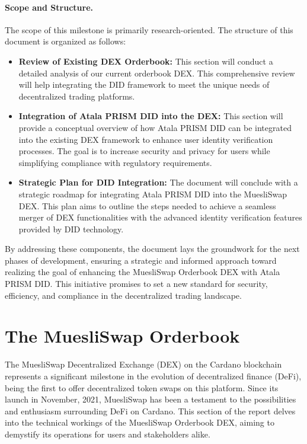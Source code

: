 \documentclass[11pt]{article}
\begin{document}
\paragraph{Scope and Structure.} The scope of this milestone is primarily research-oriented. The structure of this document is organized as follows:
\begin{itemize}
\item \textbf{Review of Existing DEX Orderbook:} This section will conduct a detailed analysis of our current orderbook DEX. This comprehensive review will help integrating the DID framework to meet the unique needs of decentralized trading platforms.

\item \textbf{Integration of Atala PRISM DID into the DEX:} This section will provide a conceptual overview of how Atala PRISM DID can be integrated into the existing DEX framework to enhance user identity verification processes. The goal is to increase security and privacy for users while simplifying compliance with regulatory requirements.
\item \textbf{Strategic Plan for DID Integration:} The document will conclude with a strategic roadmap for integrating Atala PRISM DID into the MuesliSwap DEX. This plan aims to outline the steps needed to achieve a seamless merger of DEX functionalities with the advanced identity verification features provided by DID technology.
\end{itemize}

By addressing these components, the document lays the groundwork for the next phases of development, ensuring a strategic and informed approach toward realizing the goal of enhancing the MuesliSwap Orderbook DEX with Atala PRISM DID. This initiative promises to set a new standard for security, efficiency, and compliance in the decentralized trading landscape.

\newpage

\section{The MuesliSwap Orderbook}

The MuesliSwap Decentralized Exchange (DEX) on the Cardano blockchain represents a significant milestone in the evolution of decentralized finance (DeFi), being the first to offer decentralized token swaps on this platform. Since its launch in November, 2021, MuesliSwap has been a testament to the possibilities and enthusiasm surrounding DeFi on Cardano. This section of the report delves into the technical workings of the MuesliSwap Orderbook DEX, aiming to demystify its operations for users and stakeholders alike.
\end{document}
